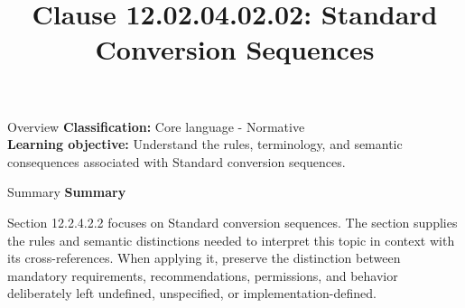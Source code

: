 \documentclass[10pt,letterpaper]{article}
\title{Clause 12.02.04.02.02: Standard Conversion Sequences}
\author{}
\date{}
\begin{document}
\maketitle
\begin{CornellOverviewBox}{Overview}
\textbf{Classification:} Core language - Normative\\[2pt]
\textbf{Learning objective:} Understand the rules, terminology, and semantic consequences associated with Standard conversion sequences.
\end{CornellOverviewBox}\begin{CornellSummaryBox}{Summary}
{\sffamily\bfseries\color{Accent} Summary}\par\vspace{3pt}Section 12.2.4.2.2 focuses on Standard conversion sequences. The section supplies the rules and semantic distinctions needed to interpret this topic in context with its cross-references. When applying it, preserve the distinction between mandatory requirements, recommendations, permissions, and behavior deliberately left undefined, unspecified, or implementation-defined.
\end{CornellSummaryBox}
\end{document}
